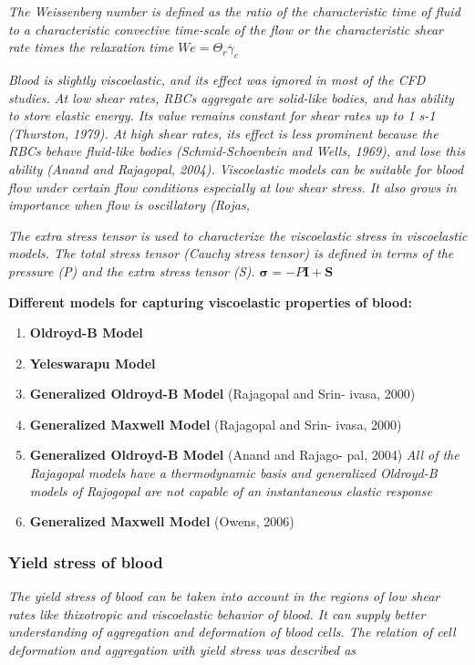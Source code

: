 \documentclass[11pt,letterpaper]{article}
\begin{document}
\textit{The Weissenberg number is  defined as the ratio of  the characteristic time of fluid to  a characteristic convective time-scale of the flow or the characteristic shear rate times the relaxation time $We = \Theta_r \Dot{\gamma_c}$}

\textit{Blood is slightly  viscoelastic, and  its  effect was  ignored in
most  of the CFD studies. At low shear rates, RBCs aggregate are solid-like bodies, and  has ability to store elastic energy.  Its value remains constant  for shear rates up  to 1 s-1
 (Thurston, 1979).  At  high shear rates, its  effect is less  prominent because the RBCs behave fluid-like  bodies (Schmid-Schoenbein and Wells, 1969), and  lose this ability  (Anand and Rajagopal, 2004). Viscoelastic models can be suitable  for  blood flow under certain flow conditions  especially at  low shear  stress. It also grows in importance when flow is oscillatory (Rojas,}
 
 \textit{The extra stress tensor is used to characterize the viscoelastic stress in viscoelastic models. The total stress tensor (Cauchy stress tensor) is defined in terms of the pressure (P) and the  extra stress tensor (S). $\bm{\sigma}= -P\bm{I+ \bm{S}}$}

\textbf{Different models for capturing viscoelastic properties of blood:}\newline
{\color{red} \begin{enumerate}
\item \textbf{Oldroyd-B Model}
\item \textbf{Yeleswarapu Model}
\item \textbf{Generalized Oldroyd-B Model} (Rajagopal and Srin- ivasa, 2000)
\item \textbf{Generalized Maxwell Model} (Rajagopal and Srin- ivasa, 2000)
\item \textbf{Generalized Oldroyd-B Model}  (Anand and Rajago- pal, 2004) \textit{All of the Rajagopal models have a thermodynamic basis
and  generalized Oldroyd-B models of Rajogopal are not capable of an instantaneous elastic response}
\item \textbf{Generalized Maxwell Model}  (Owens,  2006)
\end{enumerate} 
}

\subsubsection*{Yield stress of blood}
\textit{The yield  stress of blood can  be taken  into  account in  the
regions of low shear rates like thixotropic and viscoelastic behavior of blood.  It can supply better  understanding  of aggregation  and  deformation of blood cells. The  relation of cell deformation and aggregation with yield stress was described as}
\end{document}
